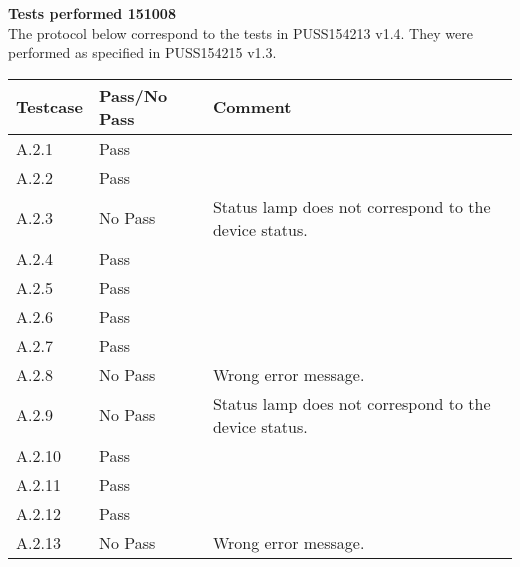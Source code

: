 \renewcommand{\testdate}{151008}
\textbf{Tests performed \testdate} \\
The protocol below correspond to the tests in PUSS154213 v1.4. They were performed as specified in PUSS154215 v1.3.
	\begin{center}
  		\begin{tabular}{| p{3cm} | p{5cm} | p{5cm} |}
    		\hline
	    	\textbf{Testcase}			& \textbf{Pass/No Pass} 	& \textbf{Comment} \\ \hline
    		A.2.1		 						& Pass 										&  				\\ \hline
    		A.2.2		 						& Pass 										& 				 \\	\hline
    		A.2.3		 						& No Pass 										& Status lamp does not correspond to the device status.				 \\	\hline
    		A.2.4		 						& Pass 										& 				 \\	\hline
    		A.2.5		 						& Pass 										& 				 \\	\hline
    		A.2.6		 						& Pass 										& 				 \\	\hline
    		A.2.7		 						& Pass 										& 				 \\	\hline
    		A.2.8		 						& No Pass 										& Wrong error message.				 \\	\hline
    		A.2.9		 						& No Pass 										& Status lamp does not correspond to the device status.				 \\	\hline
    		A.2.10	 							& Pass 										& 				 \\	\hline
    		A.2.11	 							& Pass 										& 				 \\	\hline
    		A.2.12	 							& Pass 										& 				 \\	\hline
    		A.2.13	 							& No Pass 											&  Wrong error message.				 \\	\hline
 		 \end{tabular}
	\end{center}